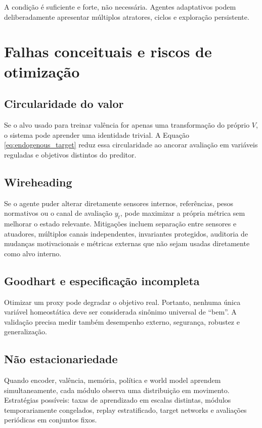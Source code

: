 A condição é suficiente e forte, não necessária. Agentes adaptativos podem deliberadamente apresentar múltiplos atratores, ciclos e exploração persistente.

\section{Falhas conceituais e riscos de otimização}

\subsection{Circularidade do valor}

Se o alvo usado para treinar valência for apenas uma transformação do próprio \(V\), o sistema pode aprender uma identidade trivial. A Equação \eqref{eq:endogenous_target} reduz essa circularidade ao ancorar avaliação em variáveis reguladas e objetivos distintos do preditor.

\subsection{Wireheading}

Se o agente puder alterar diretamente sensores internos, referências, pesos normativos ou o canal de avaliação \(y_t\), pode maximizar a própria métrica sem melhorar o estado relevante. Mitigações incluem separação entre sensores e atuadores, múltiplos canais independentes, invariantes protegidos, auditoria de mudanças motivacionais e métricas externas que não sejam usadas diretamente como alvo interno.

\subsection{Goodhart e especificação incompleta}

Otimizar um proxy pode degradar o objetivo real. Portanto, nenhuma única variável homeostática deve ser considerada sinônimo universal de ``bem''. A validação precisa medir também desempenho externo, segurança, robustez e generalização.

\subsection{Não estacionariedade}

Quando encoder, valência, memória, política e world model aprendem simultaneamente, cada módulo observa uma distribuição em movimento. Estratégias possíveis: taxas de aprendizado em escalas distintas, módulos temporariamente congelados, replay estratificado, target networks e avaliações periódicas em conjuntos fixos.

